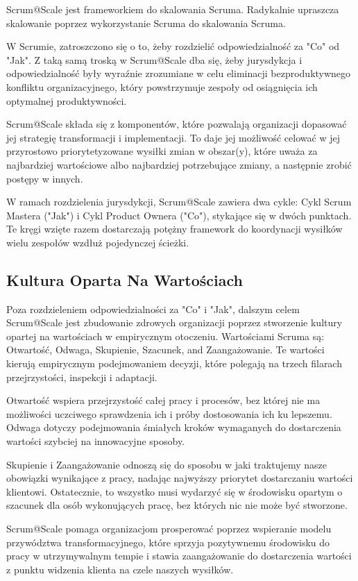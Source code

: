 \documentclass[12pt,a4paper,parskip=full]{scrartcl}
\begin{document}
Scrum@Scale jest frameworkiem do skalowania Scruma. Radykalnie upraszcza skalowanie poprzez wykorzystanie Scruma do skalowania Scruma.

W Scrumie, zatroszczono się o to, żeby rozdzielić odpowiedzialność za "Co" od "Jak". Z taką samą troską w Scrum@Scale dba się, żeby jurysdykcja i odpowiedzialność były wyraźnie zrozumiane w celu eliminacji bezproduktywnego konfliktu organizacyjnego, który powstrzymuje zespoły od osiągnięcia ich optymalnej produktywności.

Scrum@Scale składa się z komponentów, które pozwalają organizacji dopasować jej strategię transformacji i implementacji. To daje jej możliwość celować w jej przyrostowo priorytetyzowane wysiłki zmian w obszar(y), które uważa za najbardziej wartościowe albo najbardziej potrzebujące zmiany, a następnie zrobić postępy w innych.

W ramach rozdzielenia jurysdykcji, Scrum@Scale zawiera dwa cykle: Cykl Scrum Mastera ("Jak") i Cykl Product Ownera ("Co"), stykające się w dwóch punktach. Te kręgi wzięte razem dostarczają potężny framework do koordynacji wysiłków wielu zespołów wzdłuż pojedynczej ścieżki.

\subsection{Kultura Oparta Na Wartościach}

Poza rozdzieleniem odpowiedzialności za "Co" i "Jak", dalszym celem Scrum@Scale jest zbudowanie zdrowych organizacji poprzez stworzenie kultury opartej na wartościach w empirycznym otoczeniu. Wartościami Scruma są: Otwartość, Odwaga, Skupienie, Szacunek, and Zaangażowanie. Te wartości kierują empirycznym podejmowaniem decyzji, które polegają na trzech filarach przejrzystości, inspekcji i adaptacji.

Otwartość wspiera przejrzystość całej pracy i procesów, bez której nie ma możliwości uczciwego sprawdzenia ich i próby dostosowania ich ku lepszemu. Odwaga dotyczy podejmowania śmiałych kroków wymaganych do dostarczenia wartości szybciej na innowacyjne sposoby.

Skupienie i Zaangażowanie odnoszą się do sposobu w jaki traktujemy nasze obowiązki wynikające z pracy, nadając najwyższy priorytet dostarczaniu wartości klientowi. Ostatecznie, to wszystko musi wydarzyć się w środowisku opartym o szacunek dla osób wykonujących pracę, bez których nic nie może być stworzone.

Scrum@Scale pomaga organizacjom prosperować poprzez wspieranie modelu przywództwa transformacyjnego, które sprzyja pozytywnemu środowisku do pracy w utrzymywalnym tempie i stawia zaangażowanie do dostarczenia wartości z punktu widzenia klienta na czele naszych wysiłków.
\end{document}
